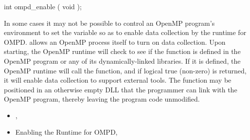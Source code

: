 \cspecificstart
\begin{ompSyntax}
int ompd_enable ( void );
\end{ompSyntax}
\cspecificend


\descr

In some cases it may not be possible to control an OpenMP program's
environment to set the  variable so as to enable
data collection by the runtime for OMPD.
 allows an OpenMP process itself to turn on data collection.
Upon starting, the OpenMP runtime will check to see if the function
 is defined in the OpenMP program or any of
its dynamically-linked libraries.
If it is defined, the OpenMP runtime will call the function,
and if logical true (non-zero) is returned, it will enable data
collection to support external tools.
The function may be positioned in an otherwise empty DLL that the
programmer can link with the OpenMP program, thereby leaving
the program code unmodified.

\crossreferences
\begin{itemize}
\item
  , 
\item
  Enabling the Runtime for OMPD, 
\end{itemize}
